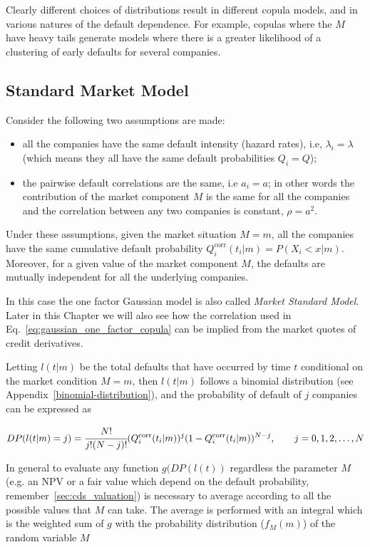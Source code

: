 Clearly different choices of distributions result in different copula models, and in various natures of the default dependence. For example, copulas where the \(M\) have heavy tails generate models where there is a greater likelihood of a clustering of early defaults for several companies.

\subsection{Standard Market Model}\label{standard-market-model}

Consider the following two assumptions are made:

\begin{itemize}
	\tightlist
	\item
	all the companies have the same default intensity (hazard rates), i.e, \(\lambda_i = \lambda\) (which means they all have the same default probabilities $Q_i = Q$);
	\item
	the pairwise default correlations are the same, i.e \(a_i = a\); in other words the contribution of the market
	component $M$ is the same for all the companies and the correlation between any two companies is constant, \(\rho = a^2\).
\end{itemize}

Under these assumptions, given the market situation \(M = m\), all the companies have the same cumulative default probability \(Q_i^{\textrm{corr}}(t_i|m)=P(X_i < x|m)\). Moreover, for a given value of the market component \(M\), the defaults are mutually independent for all the underlying companies. 

In this case the one factor Gaussian model is also called \emph{Market Standard Model}. Later in this Chapter we will also see how the correlation used in Eq.~\ref{eq:gaussian_one_factor_copula} can be implied from the market quotes of credit derivatives.

Letting \(l(t|m)\) be the total defaults that have occurred by time \(t\) conditional on the market condition \(M = m\), then \(l(t|m)\) follows a binomial distribution (see Appendix~\ref{binomial-distribution}), and the probability of default of $j$ companies can be expressed as

\begin{equation}
DP(l(t|m) = j) = \cfrac{N!}{j!(N-j)!}(Q_i^{\textrm{corr}}(t_i|m))^j(1-Q_i^{\textrm{corr}}(t_i|m))^{N-j},\qquad  j=0, 1, 2,\ldots,N
\end{equation}

In general to evaluate any function $g(DP(l(t))$ regardless the parameter $M$ (e.g. an NPV or a fair value which depend on the default probability, remember~\ref{sec:cds_valuation}) is necessary to average according to all the possible values that $M$ can take. The average is performed with an integral which is the weighted sum of $g$ with the probability distribution ($f_M(m)$) of the random variable $M$  

